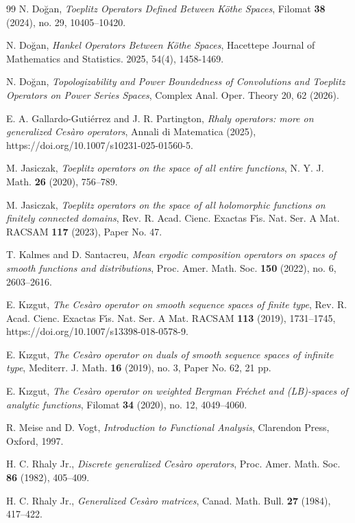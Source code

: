 \documentclass{birkjour}
\theoremstyle{definition}
\theoremstyle{remark}
\numberwithin{equation}{section}
\begin{document}
\begin{thebibliography}{99}
 N. Do\u{g}an, \textit{Toeplitz Operators Defined Between K\"{o}the Spaces}, Filomat \textbf{38} (2024), no. 29, 10405--10420.

 N. Do\u{g}an, \textit{Hankel Operators Between K\"{o}the Spaces}, Hacettepe Journal of Mathematics and Statistics. 2025, 54(4), 1458-1469.

 N. Do\u{g}an, \textit{Topologizability and Power Boundedness of Convolutions and Toeplitz Operators on Power Series Spaces}, Complex Anal. Oper. Theory 20, 62 (2026).

 E. A. Gallardo-Guti\'{e}rrez and J. R. Partington, \textit{Rhaly operators: more on generalized Ces\`{a}ro operators}, Annali di Matematica (2025), https://doi.org/10.1007/s10231-025-01560-5.

 M. Jasiczak, \textit{Toeplitz operators on the space of all entire functions}, N. Y. J. Math. \textbf{26} (2020), 756--789.

 M. Jasiczak, \textit{Toeplitz operators on the space of all holomorphic functions on finitely connected domains}, Rev. R. Acad. Cienc. Exactas F\'{\i}s. Nat. Ser. A Mat. RACSAM \textbf{117} (2023), Paper No. 47.

 T. Kalmes and D. Santacreu, \textit{Mean ergodic composition operators on spaces of smooth functions and distributions}, Proc. Amer. Math. Soc. \textbf{150} (2022), no. 6, 2603--2616.

 E. Kızgut, \textit{The Ces\`{a}ro operator on smooth sequence spaces of finite type}, Rev. R. Acad. Cienc. Exactas F\'{\i}s. Nat. Ser. A Mat. RACSAM \textbf{113} (2019), 1731--1745, https://doi.org/10.1007/s13398-018-0578-9.

 E. Kızgut, \textit{The Ces\`{a}ro operator on duals of smooth sequence spaces of infinite type}, Mediterr. J. Math. \textbf{16} (2019), no. 3, Paper No. 62, 21 pp.

 E. Kızgut, \textit{The Ces\`{a}ro operator on weighted Bergman Fr\'{e}chet and (LB)-spaces of analytic functions}, Filomat \textbf{34} (2020), no. 12, 4049--4060.

 R. Meise and D. Vogt, \textit{Introduction to Functional Analysis}, Clarendon Press, Oxford, 1997.

 H. C. Rhaly Jr., \textit{Discrete generalized Ces\`{a}ro operators}, Proc. Amer. Math. Soc. \textbf{86} (1982), 405--409.

 H. C. Rhaly Jr., \textit{Generalized Ces\`{a}ro matrices}, Canad. Math. Bull. \textbf{27} (1984), 417--422.


\end{thebibliography}
\end{document}
